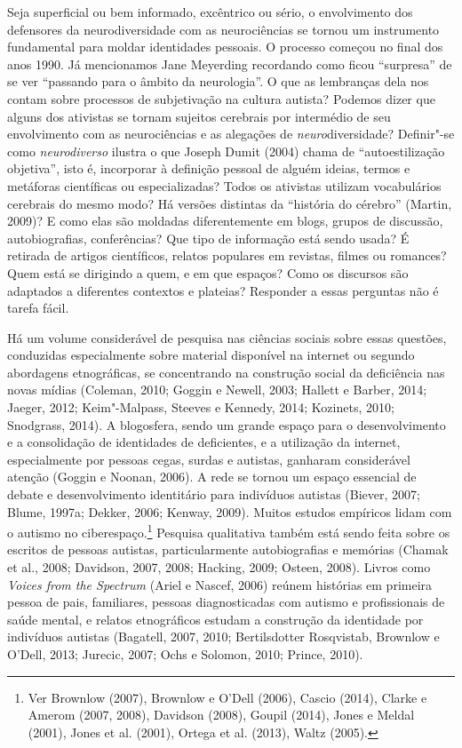 Seja superficial ou bem informado, excêntrico ou sério, o envolvimento
dos defensores da neurodiversidade com as neurociências se tornou um
instrumento fundamental para moldar identidades pessoais. O processo
começou no final dos anos 1990. Já mencionamos Jane Meyerding recordando
como ficou ``surpresa'' de se ver ``passando para o âmbito da
neurologia''. O que as lembranças dela nos contam sobre processos de
subjetivação na cultura autista? Podemos dizer que alguns dos ativistas
se tornam sujeitos cerebrais por intermédio de seu envolvimento com as
neurociências e as alegações de \emph{neuro}diversidade? Definir"-se como
\emph{neurodiverso} ilustra o que Joseph Dumit (2004) chama de
``autoestilização objetiva'', isto é, incorporar à definição pessoal de
alguém ideias, termos e metáforas científicas ou especializadas? Todos
os ativistas utilizam vocabulários cerebrais do mesmo modo? Há versões
distintas da ``história do cérebro'' (Martin, 2009)? E como elas são
moldadas diferentemente em blogs, grupos de discussão, autobiografias,
conferências? Que tipo de informação está sendo usada? É retirada de
artigos científicos, relatos populares em revistas, filmes ou romances?
Quem está se dirigindo a quem, e em que espaços? Como os discursos são
adaptados a diferentes contextos e plateias? Responder a essas perguntas
não é tarefa fácil.

Há um volume considerável de pesquisa nas ciências sociais sobre essas
questões, conduzidas especialmente sobre material disponível na internet
ou segundo abordagens etnográficas, se concentrando na construção social
da deficiência nas novas mídias (Coleman, 2010; Goggin e Newell, 2003;
Hallett e Barber, 2014; Jaeger, 2012; Keim"-Malpass, Steeves e Kennedy,
2014; Kozinets, 2010; Snodgrass, 2014). A blogosfera, sendo um grande
espaço para o desenvolvimento e a consolidação de identidades de
deficientes, e a utilização da internet, especialmente por pessoas
cegas, surdas e autistas, ganharam considerável atenção (Goggin e
Noonan, 2006). A rede se tornou um espaço essencial de debate e
desenvolvimento identitário para indivíduos autistas (Biever, 2007;
Blume, 1997a; Dekker, 2006; Kenway, 2009). Muitos estudos empíricos
lidam com o autismo no ciberespaço.\footnote[21]{Ver Brownlow (2007), Brownlow e O'Dell (2006), Cascio (2014),
Clarke e Amerom (2007, 2008), Davidson (2008), Goupil (2014), Jones e
Meldal (2001), Jones et al. (2001), Ortega et al. (2013), Waltz (2005).} Pesquisa
qualitativa também está sendo feita sobre os escritos de pessoas
autistas, particularmente autobiografias e memórias (Chamak et al.,
2008; Davidson, 2007, 2008; Hacking, 2009; Osteen, 2008). Livros como
\emph{Voices from the Spectrum} (Ariel e Nascef, 2006) reúnem histórias
em primeira pessoa de pais, familiares, pessoas diagnosticadas com autismo
e profissionais de saúde mental, e relatos etnográficos estudam a
construção da identidade por indivíduos autistas (Bagatell, 2007, 2010;
Bertilsdotter Rosqvistab, Brownlow e O'Dell, 2013; Jurecic, 2007; Ochs e
Solomon, 2010; Prince, 2010).

